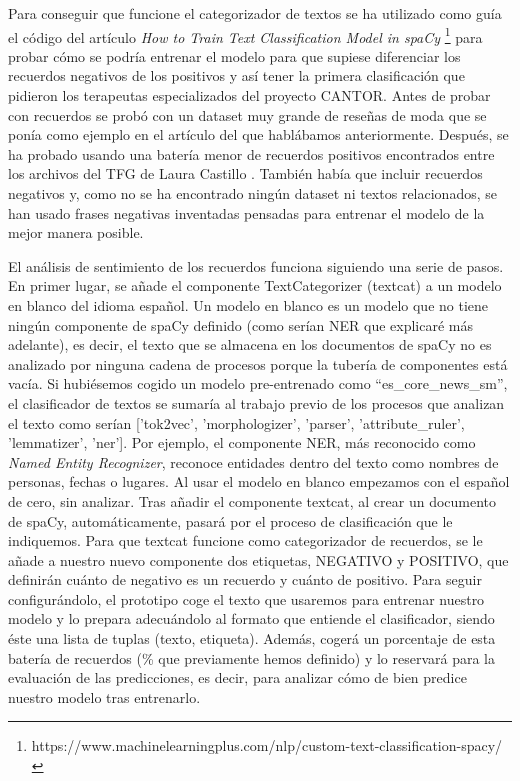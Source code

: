 Para conseguir que funcione el categorizador de textos se ha utilizado como guía el código del artículo \textit{How to Train Text Classification Model in spaCy} \footnote{https://www.machinelearningplus.com/nlp/custom-text-classification-spacy/} para probar cómo se podría entrenar el modelo para que supiese diferenciar los recuerdos negativos de los positivos y así tener la primera clasificación que pidieron los terapeutas especializados del proyecto CANTOR. Antes de probar con recuerdos se probó con un dataset muy grande de reseñas de moda que se ponía como ejemplo en el artículo del que hablábamos anteriormente. Después, se ha probado usando una batería menor de recuerdos positivos encontrados entre los archivos del TFG de Laura Castillo \citep{reminiscencia}. También había que incluir recuerdos negativos y, como no se ha encontrado ningún dataset ni textos relacionados, se han usado frases negativas inventadas pensadas para entrenar el modelo de la mejor manera posible.

El análisis de sentimiento de los recuerdos funciona siguiendo una serie de pasos. En primer lugar, se añade el componente TextCategorizer (textcat) a un modelo en blanco del idioma español. Un modelo en blanco es un modelo que no tiene ningún componente de spaCy definido (como serían NER que explicaré más adelante), es decir, el texto que se almacena en los documentos de spaCy no es analizado por ninguna cadena de procesos porque la tubería de componentes está vacía. Si hubiésemos cogido un modelo pre-entrenado como ``es\_core\_news\_sm'', el clasificador de textos se sumaría al trabajo previo de los procesos que analizan el texto como serían ['tok2vec', 'morphologizer', 'parser', 'attribute\_ruler', 'lemmatizer', 'ner']. Por ejemplo, el componente NER, más reconocido como \textit{Named Entity Recognizer}, reconoce entidades dentro del texto como nombres de personas, fechas o lugares. Al usar el modelo en blanco empezamos con el español de cero, sin analizar. Tras añadir el componente textcat, al crear un documento de spaCy, automáticamente, pasará por el proceso de clasificación que le indiquemos. Para que textcat funcione como categorizador de recuerdos, se le añade a nuestro nuevo componente dos etiquetas, NEGATIVO y POSITIVO, que definirán cuánto de negativo es un recuerdo y cuánto de positivo. Para seguir configurándolo, el prototipo coge el texto que usaremos para entrenar nuestro modelo y lo prepara adecuándolo al formato que entiende el clasificador, siendo éste una lista de tuplas (texto, etiqueta). Además, cogerá un porcentaje de esta batería de recuerdos (\% que previamente hemos definido) y lo reservará para la evaluación de las predicciones, es decir, para analizar cómo de bien predice nuestro modelo tras entrenarlo. 

